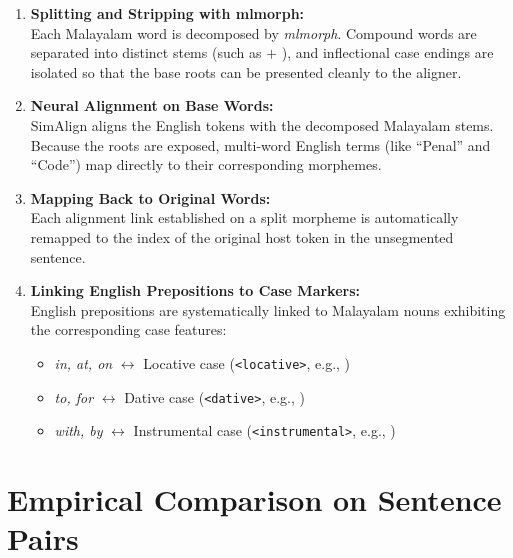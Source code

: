 \begin{enumerate}
    \item \textbf{Splitting and Stripping with mlmorph:}\\
    Each Malayalam word is decomposed by \textit{mlmorph}. Compound words are separated into distinct stems (such as  $+$ ), and inflectional case endings are isolated so that the base roots can be presented cleanly to the aligner.
    
    \item \textbf{Neural Alignment on Base Words:}\\
    SimAlign aligns the English tokens with the decomposed Malayalam stems. Because the roots are exposed, multi-word English terms (like ``Penal'' and ``Code'') map directly to their corresponding morphemes.

    \item \textbf{Mapping Back to Original Words:}\\
    Each alignment link established on a split morpheme is automatically remapped to the index of the original host token in the unsegmented sentence.

    \item \textbf{Linking English Prepositions to Case Markers:}\\
    English prepositions are systematically linked to Malayalam nouns exhibiting the corresponding case features:
    \begin{itemize}[noitemsep]
        \item \textit{in, at, on} $\longleftrightarrow$ Locative case (\texttt{<locative>}, e.g., )
        \item \textit{to, for} $\longleftrightarrow$ Dative case (\texttt{<dative>}, e.g., )
        \item \textit{with, by} $\longleftrightarrow$ Instrumental case (\texttt{<instrumental>}, e.g., )
    \end{itemize}
\end{enumerate}

\section{Empirical Comparison on Sentence Pairs}
\label{sec:comparative_examples}

